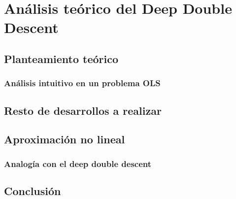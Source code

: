 
\chapter{Análisis teórico del Deep Double Descent}\label{ch:analisis-teorico-ddd}

\section{Planteamiento teórico}\label{sec:planteamiento-teorico}

\subsection{Análisis intuitivo en un problema OLS}

\section{Resto de desarrollos a realizar}\label{sec:zzzz}

\section{Aproximación no lineal}\label{sec:aproximacion-no-lineal}

\subsection{Analogía con el deep double descent}

\section{Conclusión}\label{sec:conclusion-matematica}

\endinput